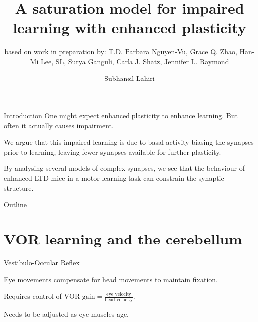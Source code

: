 \documentclass{beamer}%
\title[Saturation by enh. plasticity impairs learning]{A saturation model for impaired learning with enhanced plasticity}
\subtitle{\small{based on work in preparation by: T.D. Barbara Nguyen-Vu, Grace Q. Zhao, Han-Mi Lee, SL, Surya Ganguli, Carla J. Shatz, Jennifer L. Raymond
}}
\author{Subhaneil Lahiri%
}
\institute[Stanford]{%
Stanford University, Applied Physics
}
\begin{document}

\begin{frame}
%
 \titlepage
%
\end{frame}


\begin{frame}{Introduction}
%
 One might expect enhanced plasticity to enhance learning.
 But often it actually causes impairment.
 
 \vp We argue that this impaired learning is due to basal activity biasing the synapses prior to learning, leaving fewer synapses available for further plasticity.
 
 \vp By analysing several models of complex synapses, we see that the behaviour of enhanced LTD mice in a motor learning task can constrain the synaptic structure.
%
\end{frame}


\begin{frame}{Outline}
%
 \tableofcontents[hideallsubsections]
%
\end{frame}



\section{VOR learning and the cerebellum}


\begin{frame}{Vestibulo-Occular Reflex}
%
 \parbox[t]{0.4\linewidth}{}
 \parbox[t]{0.59\linewidth}{%
 Eye movements compensate for head movements to maintain fixation.

 \vp Requires control of $\text{VOR gain} = \frac{\text{eye velocity}}{\text{head velocity}}$.

 \vp Needs to be adjusted as eye muscles age, \etc
 }
 
%
\end{frame}
\end{document}

